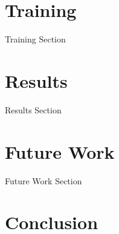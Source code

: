 \documentclass[acmsmall]{acmart}
\begin{document}
\section{Training}
\label{sec:train}

Training Section

\section{Results}
\label{sec:results}

Results Section

\section{Future Work}
\label{sec:future}

Future Work Section

\section{Conclusion}
\label{sec:conclusion}



\end{document}
